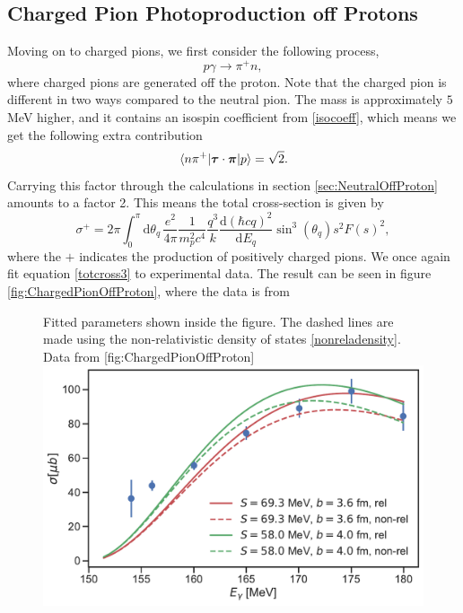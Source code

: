 \subsection{Charged Pion Photoproduction off Protons}\label{sec:CoffP}
Moving on to charged pions, we first consider the following process,
\begin{equation} \label{charged1}
	p\gamma \rightarrow \pi^+ n,
\end{equation}
where charged pions are generated off the proton. Note that the charged pion is different in two ways compared to the neutral pion. The mass is approximately $5$ MeV higher, and it contains an isospin coefficient from \eqref{isocoeff}, which means we get the following extra contribution
\begin{equation} \label{isofactorcharged}
	\mel*{n\pi^+}{\bm{\mathrm{\tau}}\cdot\bm{\mathrm{\pi}}}{p} = \sqrt{2}.
\end{equation}
Carrying this factor through the calculations in section \ref{sec:NeutralOffProton} amounts to a factor 2. This means the total cross-section is given by
\begin{equation} \label{totcross3}
	\sigma^+ =  2\pi \int_0^\pi \text{d}\theta_q \, \frac{e^2}{4\pi}\frac{1}{m_p^2c^4}\frac{q^3}{k}\frac{\text{d}(\hbar c q)^2}{\text{d}E_q}\sin^3(\theta_q) s^2 F(s)^2,
\end{equation}
where the $+$ indicates the production of positively charged pions. We once again fit equation \eqref{totcross3} to experimental data. The result can be seen in figure \ref{fig:ChargedPionOffProton}, where the data is from 
\begin{figure}[H]
	\begin{sidecaption}{Fitted parameters shown inside the figure. The dashed lines are made using the non-relativistic density of states \eqref{nonreladensity}. Data from \cite{PionOffNeutron2}}[fig:ChargedPionOffProton]
		\includegraphics[width=\linewidth]{Figures/ChargedPionOffProtonExact.pdf}
	\end{sidecaption}
\end{figure}
